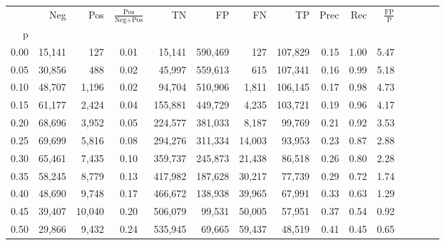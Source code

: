 \begin{tabular}{rrrcrrrrrrrrrrr}
\toprule
{} &     Neg &     Pos & $\frac{\text{Pos}}{\text{Neg}+\text{Pos}}$ &       TN &       FP &       FN &       TP &  Prec &   Rec & $\frac{\text{FP}}{\text{P}}$ \\
p    &         &         &                                            &          &          &          &          &       &       &                              \\
\midrule
0.00 &  15,141 &     127 &                                       0.01 &   15,141 &  590,469 &      127 &  107,829 &  0.15 &  1.00 &                         5.47 \\
0.05 &  30,856 &     488 &                                       0.02 &   45,997 &  559,613 &      615 &  107,341 &  0.16 &  0.99 &                         5.18 \\
0.10 &  48,707 &   1,196 &                                       0.02 &   94,704 &  510,906 &    1,811 &  106,145 &  0.17 &  0.98 &                         4.73 \\
0.15 &  61,177 &   2,424 &                                       0.04 &  155,881 &  449,729 &    4,235 &  103,721 &  0.19 &  0.96 &                         4.17 \\
0.20 &  68,696 &   3,952 &                                       0.05 &  224,577 &  381,033 &    8,187 &   99,769 &  0.21 &  0.92 &                         3.53 \\
0.25 &  69,699 &   5,816 &                                       0.08 &  294,276 &  311,334 &   14,003 &   93,953 &  0.23 &  0.87 &                         2.88 \\
0.30 &  65,461 &   7,435 &                                       0.10 &  359,737 &  245,873 &   21,438 &   86,518 &  0.26 &  0.80 &                         2.28 \\
0.35 &  58,245 &   8,779 &                                       0.13 &  417,982 &  187,628 &   30,217 &   77,739 &  0.29 &  0.72 &                         1.74 \\
0.40 &  48,690 &   9,748 &                                       0.17 &  466,672 &  138,938 &   39,965 &   67,991 &  0.33 &  0.63 &                         1.29 \\
0.45 &  39,407 &  10,040 &                                       0.20 &  506,079 &   99,531 &   50,005 &   57,951 &  0.37 &  0.54 &                         0.92 \\
0.50 &  29,866 &   9,432 &                                       0.24 &  535,945 &   69,665 &   59,437 &   48,519 &  0.41 &  0.45 &                         0.65 \\

\end{tabular}
